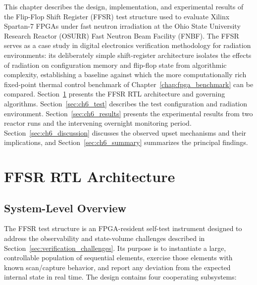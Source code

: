 This chapter describes the design, implementation, and experimental
results of the Flip-Flop Shift Register (FFSR) test structure used to
evaluate Xilinx Spartan-7 FPGAs under fast neutron irradiation at the
Ohio State University Research Reactor (OSURR) Fast Neutron Beam
Facility (FNBF).  The FFSR serves as a case study in digital electronics
verification methodology for radiation environments: its deliberately
simple shift-register architecture isolates the effects of radiation on
configuration memory and flip-flop state from algorithmic complexity,
establishing a baseline against which the more computationally rich
fixed-point thermal control benchmark of Chapter~\ref{chap:fpga_benchmark}
can be compared.  Section~\ref{sec:ch6_architecture} presents the FFSR RTL
architecture and governing algorithms.  Section~\ref{sec:ch6_test}
describes the test configuration and radiation environment.
Section~\ref{sec:ch6_results} presents the experimental results from two
reactor runs and the intervening overnight monitoring period.
Section~\ref{sec:ch6_discussion} discusses the observed upset mechanisms
and their implications, and Section~\ref{sec:ch6_summary} summarizes the
principal findings.

\section{FFSR RTL Architecture}
\label{sec:ch6_architecture}

\subsection{System-Level Overview}
\label{subsec:ch6_arch_overview}

The FFSR test structure is an FPGA-resident self-test instrument
designed to address the observability and state-volume challenges
described in Section~\ref{sec:verification_challenges}.  Its purpose is to
instantiate a large, controllable population of sequential elements,
exercise those elements with known scan/capture behavior, and report
any deviation from the expected internal state in real time.  The design
contains four cooperating subsystems:

